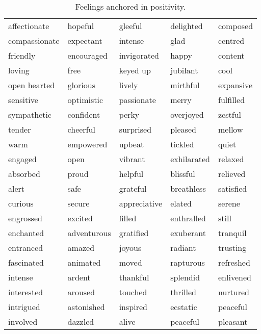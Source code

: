 \begin{small}
        \begin{longtable}{ p{} p{}  p{}  p{}  p{} }
                \caption{Feelings anchored in positivity.}\label{table:feelings-positive}\\[-.5em]
                \toprule
                affectionate & hopeful & gleeful & delighted & composed \\
                compassionate & expectant & intense & glad & centred \\
                friendly & encouraged & invigorated & happy & content \\
                loving & free & keyed up & jubilant & cool \\
                open hearted & glorious & lively & mirthful & expansive \\
                sensitive & optimistic & passionate & merry & fulfilled \\
                sympathetic & confident & perky & overjoyed & zestful\\
                tender & cheerful & surprised & pleased & mellow \\
                warm & empowered & upbeat & tickled & quiet \\
                engaged & open & vibrant & exhilarated & relaxed \\
                absorbed & proud & helpful & blissful & relieved \\
                alert & safe & grateful & breathless & satisfied \\
                curious & secure & appreciative & elated & serene \\
                engrossed & excited & filled & enthralled & still \\
                enchanted & adventurous & gratified & exuberant & tranquil \\
                entranced & amazed & joyous & radiant & trusting \\
                fascinated & animated & moved & rapturous & refreshed \\
                intense & ardent & thankful & splendid & enlivened \\
                interested & aroused & touched & thrilled & nurtured \\
                intrigued & astonished & inspired & ecstatic & peaceful \\
                involved & dazzled & alive & peaceful & pleasant \\

\end{longtable}
\end{small}
